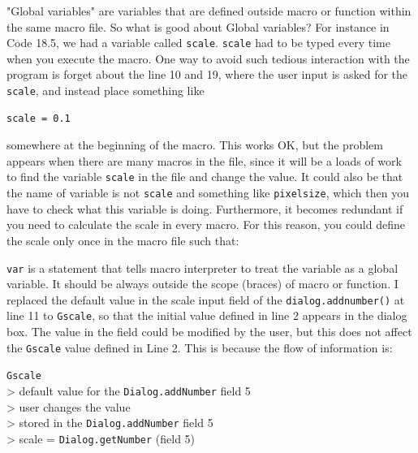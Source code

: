 \documentclass[11pt,a4paper,oneside]{report}
\newcommand{\ilcom}[1]{\texttt{\small#1}}
\newcommand{\tab}{\hspace*{3em}}
\begin{document}
"Global variables" are variables that are defined outside macro or function within the same macro file. So what is good about Global variables? For instance in Code 18.5, we had a variable called \ilcom{scale}. \ilcom{scale} had to be typed every time when you execute the macro. One way to avoid such tedious interaction with the program is forget about the line 10 and 19, where the user input is asked for the \ilcom{scale}, and instead place something like
\begin{lstlisting}[numbers=none]
scale = 0.1
\end{lstlisting}
somewhere at the beginning of the macro. This works OK, but the problem appears 
when there are many macros in the file, since it will be a loads of work to 
find the variable \ilcom{scale} in the file and change the value. 
It could also be that the name of variable is not \ilcom{scale} and something like \ilcom{pixelsize}, 
which then you have to check what this variable is doing. Furthermore, 
it becomes redundant if you need to calculate the scale in every macro. 
For this reason, you could define the scale only once in the macro file such that:



\ilcom{var} is a statement that tells macro interpreter to treat the variable as a global variable. 
It should be always outside the scope (braces) of macro or function. 
I replaced the default value in the scale input field of the \ilcom{dialog.addnumber()} at line 11 
to \ilcom{Gscale}, so that the initial value defined in line 2 appears in the dialog box. 
The value in the field could be modified by the user, 
but this does not affect the \ilcom{Gscale} value defined in Line 2. 
This is because the flow of information is:

\ilcom{Gscale} \\
\tab > default value for the \ilcom{Dialog.addNumber} field 5 \\
\tab\tab > user changes the value  \\
\tab\tab\tab > stored in the \ilcom{Dialog.addNumber} field 5\\
\tab\tab\tab\tab > scale = \ilcom{Dialog.getNumber} (field 5)\\
\end{document}

